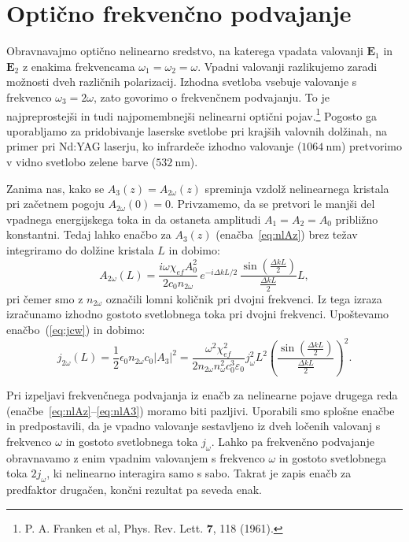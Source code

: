 \section{Optično frekvenčno podvajanje}
\label{chap:SHG}
Obravnavajmo optično nelinearno sredstvo, na katerega vpadata valovanji ${\mathbf E}_1$ in
$\mathbf{E}_2$ z enakima frekvencama $\omega_{1}=\omega_{2}=\omega$. Vpadni valovanji
razlikujemo zaradi možnosti dveh različnih polarizacij. Izhodna svetloba vsebuje valovanje
s frekvenco $\omega_{3}=2\omega$, zato govorimo o frekvenčnem 
podvajanju. To je
najpreprostejši in tudi najpomembnejši nelinearni optični pojav.\footnote{P. A. Franken et al, Phys. Rev. Lett.
$\mathbf{7}$, 118 (1961).} 
Pogosto ga uporabljamo za pridobivanje laserske svetlobe pri krajših valovnih dolžinah, na primer
pri Nd:YAG laserju, ko infrardeče izhodno valovanje ($1064~\si{\nano\metre}$) 
pretvorimo v vidno svetlobo zelene barve ($532~\si{\nano\metre}$). 

Zanima nas, kako se $A_{3}(z) = A_{2\omega}(z)$ spreminja vzdolž nelinearnega kristala
pri začetnem pogoju $A_{2\omega}(0)=0$.
Privzamemo, da se pretvori le manjši del vpadnega energijskega toka in da ostaneta 
amplitudi $A_{1}=A_{2}=A_0$ približno konstantni. Tedaj lahko
enačbo za $A_{3}(z)$ (enačba~\ref{eq:nlAz}) brez težav integriramo do dolžine kristala $L$ in 
dobimo:
\begin{equation}
A_{2\omega}(L)=\frac{i\omega \chi_{ef} A_0^2}{2c_0 n_{2\omega}}
\,e^{-i\Delta kL/2}\, \frac{\sin\left(\frac{\Delta k L}{2}\right)}{\frac{\Delta kL}{2}}L,
\label{8.9}
\end{equation}
pri čemer smo z $n_{2\omega}$ označili lomni količnik pri dvojni frekvenci.
\newpage
Iz tega izraza izračunamo izhodno gostoto svetlobnega toka pri dvojni
frekvenci. Upoštevamo enačbo~(\ref{eq:jcw}) in dobimo:
\begin{equation}
j_{2\omega}(L) =\frac{1}{2}\epsilon_{0}n_{2\omega}c_0|A_3|^2 = 
\frac{\omega^2 \chi_{ef}^2}{2 n_{2\omega} n_\omega^2c_0^3\varepsilon_0} j_\omega^2 L^2
\left(\frac{\sin\left(\frac{\Delta k L}{2}\right)}{\frac{\Delta kL}{2}}\right)^2.
\label{8.10}
\end{equation}
\begin{remark}
Pri izpeljavi frekvenčnega podvajanja iz enačb za nelinearne pojave drugega
reda (enačbe~\ref{eq:nlAz}--\ref{eq:nlA3}) moramo biti pazljivi. 
Uporabili smo splošne enačbe in predpostavili, da je 
vpadno valovanje se\-stav\-lje\-no iz dveh ločenih valovanj s frekvenco $\omega$
in gostoto svetlobnega toka $j_\omega$. Lahko pa frekvenčno podvajanje obravnavamo
z enim vpadnim valovanjem s frekvenco $\omega$ in gostoto svetlobnega toka $2j_\omega$, 
ki nelinearno interagira samo s sabo. Takrat je zapis enačb za predfaktor
drugačen, končni rezultat pa seveda enak. 
\end{remark}

